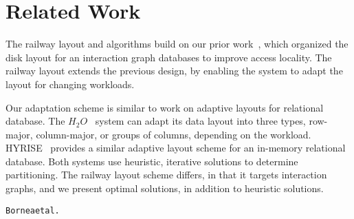 \section{Related Work}\label{sec:related}

The railway layout and algorithms build on our prior work~\cite{gedik14}, which
organized the disk layout for an interaction graph databases to improve access
locality. The railway layout extends the previous design, by enabling the system
to adapt the layout for changing workloads.

Our adaptation scheme is similar to work on adaptive layouts for relational
database. The $H_2O$~\cite{alagiannis14} system can adapt its data layout into
three types, row-major, column-major, or groups of columns, depending on the
workload. HYRISE~\cite{grund10} provides a similar adaptive layout scheme for an
in-memory relational database. Both systems use heuristic, iterative solutions
to determine partitioning. The railway layout scheme differs, in that it
targets interaction graphs, and we present optimal solutions, in addition to 
heuristic solutions.

 \begin{alltt}\scriptsize
% Gedik et al.~\cite{gedik14}
% H2O \cite{alagiannis14}
% HYRISE~\cite{grund10}
 Bornea et al.~\cite{bornea13}
 \end{alltt}

